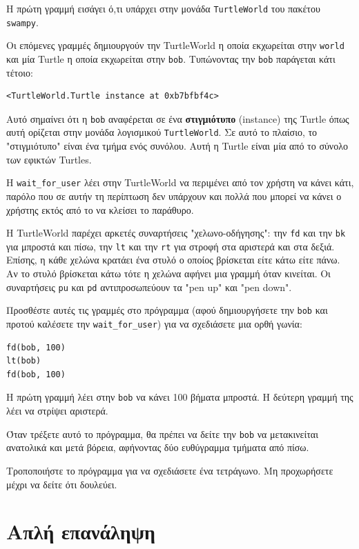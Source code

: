 \documentclass[10pt]{book}
\begin{document}
Η πρώτη γραμμή εισάγει ό,τι υπάρχει στην μονάδα {\tt TurtleWorld} 
του πακέτου {\tt swampy}. 

Οι επόμενες γραμμές δημιουργούν την TurtleWorld η οποία εκχωρείται στην
{\tt world} και μία  Turtle  η οποία εκχωρείται στην {\tt bob}. 
Τυπώνοντας την {\tt bob} παράγεται κάτι τέτοιο:


\begin{verbatim}
<TurtleWorld.Turtle instance at 0xb7bfbf4c>
\end{verbatim}
%

Αυτό σημαίνει ότι η {\tt bob} αναφέρεται σε ένα {\bf στιγμιότυπο} (instance) της Turtle όπως αυτή ορίζεται στην μονάδα λογισμικού {\tt TurtleWorld}. Σε αυτό το πλαίσιο, το "στιγμιότυπο" είναι ένα τμήμα ενός συνόλου. Αυτή η Turtle είναι μία από το σύνολο των εφικτών Turtles.

H \verb"wait_for_user" λέει στην TurtleWorld 
να περιμένει από τον χρήστη να κάνει κάτι, παρόλο που σε αυτήν
τη περίπτωση δεν υπάρχουν και πολλά που μπορεί να κάνει ο χρήστης
εκτός από το να κλείσει το παράθυρο.

Η TurtleWorld παρέχει αρκετές συναρτήσεις "χελωνο-οδήγησης": 
την {\tt fd} και την {\tt bk} για μπροστά και πίσω,
την {\tt lt} και την {\tt rt} για στροφή στα αριστερά και στα δεξιά.
Επίσης, η κάθε χελώνα κρατάει ένα στυλό ο οποίος βρίσκεται είτε κάτω είτε πάνω.
Αν το στυλό βρίσκεται κάτω τότε η χελώνα αφήνει μια γραμμή όταν κινείται. Οι συναρτήσεις {\tt pu} και {\tt pd} αντιπροσωπεύουν τα "pen up" και "pen down".


Προσθέστε αυτές τις γραμμές στο πρόγραμμα (αφού δημιουργήσετε την {\tt bob} και προτού καλέσετε την \verb"wait_for_user") για να σχεδιάσετε μια ορθή γωνία:

\begin{verbatim}
fd(bob, 100)
lt(bob)
fd(bob, 100)
\end{verbatim}
%

Η πρώτη γραμμή λέει στην {\tt bob} να κάνει 100 βήματα μπροστά.
Η δεύτερη γραμμή της λέει να στρίψει αριστερά.

Όταν τρέξετε αυτό το πρόγραμμα, θα πρέπει να δείτε την {\tt bob} να
μετακινείται ανατολικά και μετά βόρεια, αφήνοντας δύο ευθύγραμμα τμήματα από πίσω.

Τροποποιήστε το πρόγραμμα για να σχεδιάσετε ένα τετράγωνο. Μη προχωρήσετε μέχρι
να δείτε ότι δουλεύει.


\section{Απλή επανάληψη}
\label{repetition}
\end{document}
